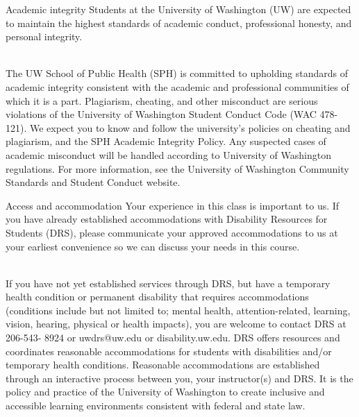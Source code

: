 \documentclass[10pt,t]{beamer}
\begin{document}
\begin{frame}{Academic integrity}
Students at the University of Washington (UW) are expected to maintain the highest standards of academic conduct, professional honesty, and personal integrity.
 \\~\

The UW School of Public Health (SPH) is committed to upholding standards of academic integrity consistent with the academic and professional communities of which it is a part. Plagiarism, cheating, and other misconduct are serious violations of the University of Washington Student Conduct Code (WAC 478-121). We expect you to know and follow the university’s policies on cheating and plagiarism, and the SPH Academic Integrity Policy. Any suspected cases of academic misconduct will be handled according to University of Washington regulations. For more information, see the University of Washington Community Standards and Student Conduct website.

\end{frame}

\begin{frame}{Access and accommodation}
\small Your experience in this class is important to us. If you have already established accommodations with Disability Resources for Students (DRS), please communicate your approved accommodations to us at your earliest convenience so we can discuss your needs in this course.
\\~\

\small If you have not yet established services through DRS, but have a temporary health condition or permanent disability that requires accommodations (conditions include but not limited to; mental health, attention-related, learning, vision, hearing, physical or health impacts), you are welcome to contact DRS at 206-543- 8924 or uwdrs@uw.edu or disability.uw.edu. DRS offers resources and coordinates reasonable accommodations for students with disabilities and/or temporary health conditions. Reasonable accommodations are established through an interactive process between you, your instructor(s) and DRS. It is the policy and practice of the University of Washington to create inclusive and accessible learning environments consistent with federal and state law.

\end{frame}
\end{document}
